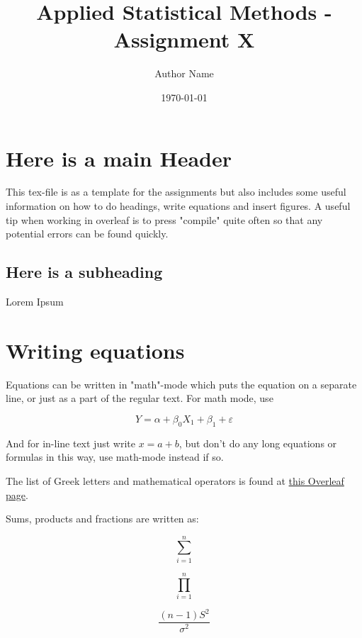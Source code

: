 \documentclass[12pt]{article}
\title{Applied Statistical Methods - Assignment X}
\author{Author Name}
\date{\today}
\begin{document}
\maketitle

\section{Here is a main Header}

This tex-file is as a template for the assignments but also includes some useful information on how to do headings, write equations and insert figures. A useful tip when working in overleaf is to press "compile" quite often so that any potential errors can be found quickly.

\subsection{Here is a subheading}

Lorem Ipsum


\section{Writing equations}

Equations can be written in "math"-mode which puts the equation on a separate line, or just as a part of the regular text. For math mode, use

\begin{equation*}
    Y = \alpha + \beta_0X_1+\beta_1+\varepsilon
\end{equation*}

And for in-line text just write $x=a+b$, but don't do any long equations or formulas in this way, use math-mode instead if so.

The list of Greek letters and mathematical operators is found at \href{https://www.overleaf.com/learn/latex/List_of_Greek_letters_and_math_symbols}{this Overleaf page}.

Sums, products and fractions are written as:

\begin{equation*}
    \sum_{i=1}^{n}
\end{equation*}

\begin{equation*}
    \prod_{i=1}^{n}
\end{equation*}

\begin{equation*}
    \frac{(n-1)S^2}{\sigma^2}
\end{equation*}
\end{document}
